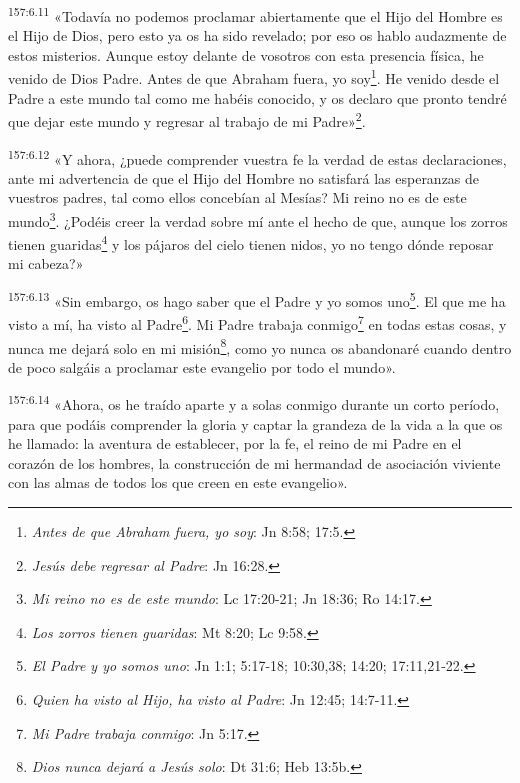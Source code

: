 \par
\textsuperscript{157:6.11} «Todavía no podemos proclamar abiertamente que el Hijo del Hombre es el Hijo de Dios, pero esto ya os ha sido revelado; por eso os hablo audazmente de estos misterios. Aunque estoy delante de vosotros con esta presencia física, he venido de Dios Padre. Antes de que Abraham fuera, yo soy\footnote{\textit{Antes de que Abraham fuera, yo soy}: Jn 8:58; 17:5.}. He venido desde el Padre a este mundo tal como me habéis conocido, y os declaro que pronto tendré que dejar este mundo y regresar al trabajo de mi Padre»\footnote{\textit{Jesús debe regresar al Padre}: Jn 16:28.}.

\par
\textsuperscript{157:6.12} «Y ahora, ¿puede comprender vuestra fe la verdad de estas declaraciones, ante mi advertencia de que el Hijo del Hombre no satisfará las esperanzas de vuestros padres, tal como ellos concebían al Mesías? Mi reino no es de este mundo\footnote{\textit{Mi reino no es de este mundo}: Lc 17:20-21; Jn 18:36; Ro 14:17.}. ¿Podéis creer la verdad sobre mí ante el hecho de que, aunque los zorros tienen guaridas\footnote{\textit{Los zorros tienen guaridas}: Mt 8:20; Lc 9:58.} y los pájaros del cielo tienen nidos, yo no tengo dónde reposar mi cabeza?»

\par
\textsuperscript{157:6.13} «Sin embargo, os hago saber que el Padre y yo somos uno\footnote{\textit{El Padre y yo somos uno}: Jn 1:1; 5:17-18; 10:30,38; 14:20; 17:11,21-22.}. El que me ha visto a mí, ha visto al Padre\footnote{\textit{Quien ha visto al Hijo, ha visto al Padre}: Jn 12:45; 14:7-11.}. Mi Padre trabaja conmigo\footnote{\textit{Mi Padre trabaja conmigo}: Jn 5:17.} en todas estas cosas, y nunca me dejará solo en mi misión\footnote{\textit{Dios nunca dejará a Jesús solo}: Dt 31:6; Heb 13:5b.}, como yo nunca os abandonaré cuando dentro de poco salgáis a proclamar este evangelio por todo el mundo».

\par
\textsuperscript{157:6.14} «Ahora, os he traído aparte y a solas conmigo durante un corto período, para que podáis comprender la gloria y captar la grandeza de la vida a la que os he llamado: la aventura de establecer, por la fe, el reino de mi Padre en el corazón de los hombres, la construcción de mi hermandad de asociación viviente con las almas de todos los que creen en este evangelio».


